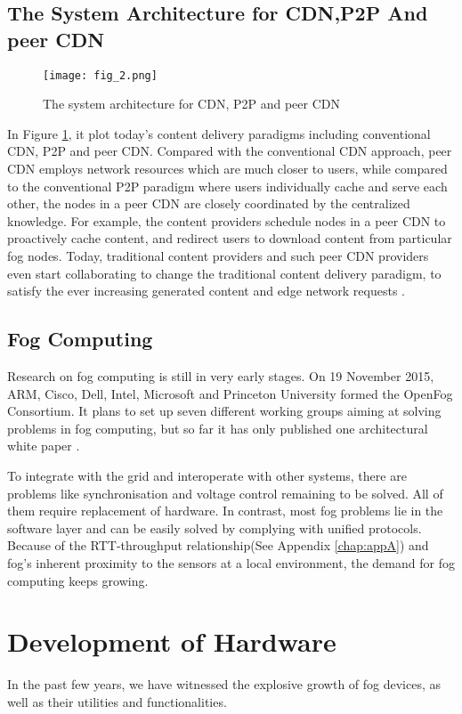 \subsection{The System Architecture for CDN,P2P And peer CDN}
\begin{figure}[htbp]
\centering
	\vskip 1.0cm
	  \texttt{[image: fig\_2.png]}
    \caption{The system architecture for CDN, P2P and peer CDN \citep{Ma2016Understanding}}
	\vskip 1.0cm
 \label{fig_2}
\end{figure}
In Figure \ref{fig_2}, it plot today's content delivery paradigms including conventional CDN,
P2P and peer CDN. Compared with the conventional CDN approach, peer
CDN employs network resources which are much closer to
users, while compared to the conventional P2P paradigm
where users individually cache and serve each other, the nodes
in a peer CDN are closely coordinated by the centralized
knowledge. For example, the content providers schedule nodes
in a peer CDN to proactively cache content, and redirect users
to download content from particular fog nodes. Today, traditional
content providers and such peer CDN providers even
start collaborating to change the traditional content delivery
paradigm, to satisfy the ever increasing generated content and
edge network requests \citep{Ma2016Understanding}.
\subsection{Fog Computing}
Research on fog computing is still in very early stages. On 19 November 2015,
ARM, Cisco, Dell, Intel, Microsoft and Princeton University formed the OpenFog Consortium.
It plans to set up seven different working groups aiming at solving problems in
fog computing, but so far it has only published one architectural white paper \citep{Cheng2014RFC}.

To integrate with the grid and interoperate with other systems, there are problems
like synchronisation and voltage control remaining to be solved. All of them require
replacement of hardware. In contrast, most fog problems lie in the software layer
and can be easily solved by complying with unified protocols. Because of the RTT-throughput
relationship(See Appendix \ref{chap:appA}) and fog’s inherent proximity to the sensors at a local environment,
 the demand for fog computing keeps growing.

\section{Development of Hardware}
In the past few years, we have witnessed the explosive growth of fog devices, as well as
their utilities and functionalities.
